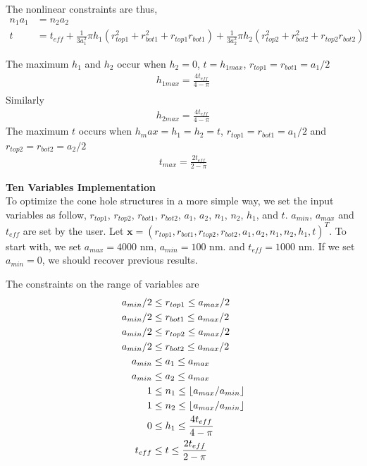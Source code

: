 \documentclass[12pt]{article}
\numberwithin{equation}{section}
\DeclarePairedDelimiter\floor{\lfloor}{\rfloor}
\numberwithin{equation}{section}
\begin{document}
\begin{outline}[enumerate]
The nonlinear constraints are thus,
\begin{align}
n_1a_1 &= n_2a_2 \\
t &= t_{eff} + \frac{1}{3a_1^2}\pi h_1(r_{top1}^2+r_{bot1}^2+r_{top1}r_{bot1})+ \frac{1}{3a_2^2} \pi h_2(r_{top2}^2+r_{bot2}^2+r_{top2}r_{bot2})
\end{align}
 

The maximum $h_1$ and $h_2$ occur when $h_2 = 0$, $t = h_{1max}$, $r_{top1} = r_{bot1} = a_1/2$ 
\begin{align*}
h_{1max} = \frac {4t_{eff}}{4- \pi}\\
\end {align*}
Similarly
\begin{align*}
h_{2max} = \frac {4t_{eff}}{4- \pi}
\end{align*}
The maximum $t$ occurs when $h_max =h_1 = h_2 = t$, $r_{top1} = r_{bot1} = a_1/2$ and $r_{top2} = r_{bot2} = a_2/2$
\begin{align*}
t_{max} = \frac {2t_{eff}}{2- \pi}
\end{align*}

\1 \textbf{Ten Variables Implementation} \\
To optimize the cone hole structures in a more simple way, we set the input variables as follow, $r_{top1}$, $r_{top2}$, $r_{bot1}$, $r_{bot2}$, $a_1$, $a_2$, $n_1$, $n_2$, $h_1$, and $t$. $a_{min}$, $a_{max}$ and $t_{eff}$ are set by the user. Let $\mathbf{x} = \left ( r_{top1}, r_{bot1}, r_{top2}, r_{bot2}, a_1, a_2, n_1, n_2, h_1, t \right )^T $. To start with, we set $a_{max} = 4000$ nm, $a_{min} = 100$ nm.  and $t_{eff} = 1000$ nm. If we set $a_{min} = 0$, we should recover previous results.

The constraints on the range of variables are
\begin{align*}
a_{min}/2 & \leq r_{top1} \leq a_{max}/2 \\
a_{min}/2 & \leq r_{bot1} \leq a_{max}/2 \\
a_{min}/2 & \leq r_{top2} \leq a_{max}/2 \\
a_{min}/2 & \leq r_{bot2} \leq a_{max}/2 \\
a_{min} & \leq a_{1} \leq a_{max} \\
a_{min} & \leq a_{2} \leq a_{max} \\
1 & \leq n_1 \leq \floor{a_{max}/a_{min}} \\
1 & \leq n_2 \leq \floor{a_{max}/a_{min}} \\
0 & \leq h_1 \leq  \frac {4t_{eff}}{4- \pi}\\ 
t_{eff} & \leq t \leq \frac {2t_{eff}}{2- \pi}
\end{align*}


\end{outline}
\end{document}

